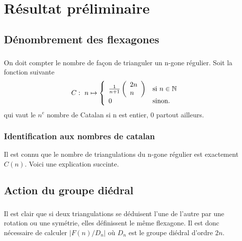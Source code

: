 \documentclass[11pt,a4paper]{report}
\begin{document}
	\chapter{Résultat préliminaire}
	\section{Dénombrement des flexagones} 
	\paragraph*{}
		On doit compter le nombre de façon de trianguler un n-gone régulier.
		Soit la fonction suivante
		\[ 
			C:\ n \mapsto \left\{ \begin{array}{ll}
			         \frac{1}{n+1}\left( \begin{array}{ll}
			2n \\
			 n \end{array} \right) & \mbox{si $ n \in \mathbb{N}$}\\
			         0 & \mbox{sinon}.\end{array} \right.
		\]
		qui vaut le $n^{e}$ nombre de Catalan si n est entier, 0 partout ailleurs.

	\subsection{Identification aux nombres de catalan}
	Il est connu que le nombre de triangulations du n-gone régulier est exactement $C(n)$. Voici une explication succinte.\\	
	
	\section{Action du groupe diédral}
		\paragraph{}
			Il est clair que si deux triangulations se déduisent l'une de l'autre par une rotation ou une symétrie, elles définissent le même flexagone. Il est donc nécessaire de calculer $|F(n)/D_{n}|$ où $D_{n}$ est le groupe diédral d'ordre $2n$.
\end{document}
